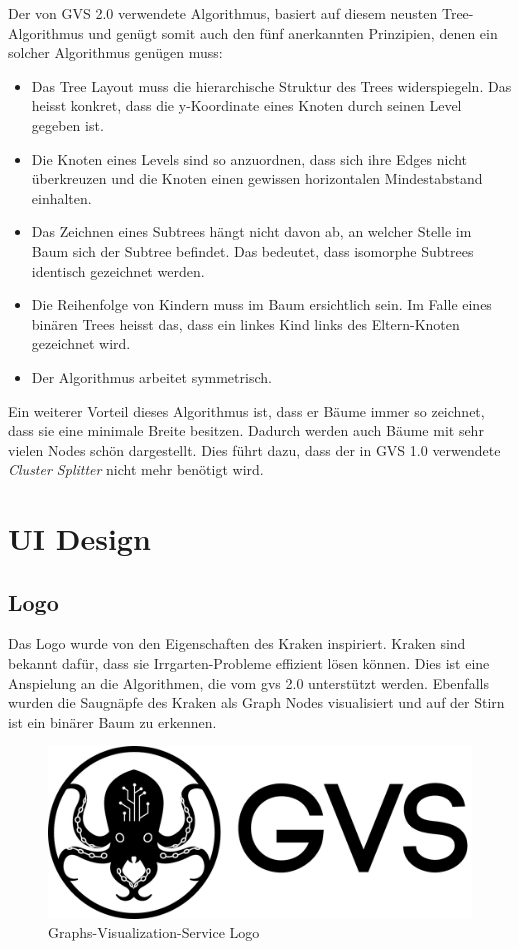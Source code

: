 \documentclass[11pt,a4paper,english,oneside]{book}
\numberwithin{equation}{chapter}
\begin{document}
	Der von GVS 2.0 verwendete Algorithmus, basiert auf diesem neusten Tree-Algorithmus und genügt somit auch den fünf anerkannten Prinzipien, denen ein solcher Algorithmus genügen muss:
	
	\begin{itemize}
		\item Das Tree Layout muss die hierarchische Struktur des Trees widerspiegeln. Das heisst konkret, dass die y-Koordinate eines Knoten durch seinen Level gegeben ist.
		\item Die Knoten eines Levels sind so anzuordnen, dass sich ihre Edges nicht überkreuzen und die Knoten einen gewissen horizontalen Mindestabstand einhalten.
		\item Das Zeichnen eines Subtrees hängt nicht davon ab, an welcher Stelle im Baum sich der Subtree befindet. Das bedeutet, dass isomorphe Subtrees identisch gezeichnet werden.
		\item Die Reihenfolge von Kindern muss im Baum ersichtlich sein. Im Falle eines binären Trees heisst das, dass ein linkes Kind links des Eltern-Knoten gezeichnet wird.
		\item Der Algorithmus arbeitet symmetrisch.
	\end{itemize}
	
	Ein weiterer Vorteil dieses Algorithmus ist, dass er Bäume immer so zeichnet, dass sie eine minimale Breite besitzen. Dadurch werden auch Bäume mit sehr vielen Nodes schön dargestellt. Dies führt dazu, dass der in GVS 1.0 \cite{gvs1} verwendete \textit{Cluster Splitter} nicht mehr benötigt wird. 
	
	\section{UI Design}
	
	\subsection{Logo}
	Das Logo wurde von den Eigenschaften des Kraken \cite{kraken} inspiriert. Kraken sind bekannt dafür, dass sie Irrgarten-Probleme effizient lösen können. Dies ist eine Anspielung an die Algorithmen, die vom \gls{gvs} 2.0 unterstützt werden. Ebenfalls wurden die Saugnäpfe des Kraken als Graph Nodes visualisiert und auf der Stirn ist ein binärer Baum zu erkennen. 
	
	\begin{figure}[h!]
		\centering
		\includegraphics[width=0.5\linewidth]{assets/images/logo}
		\caption[GVS Logo]{Graphs-Visualization-Service Logo}
		\label{fig:logo}
	\end{figure}
	
\end{document}
